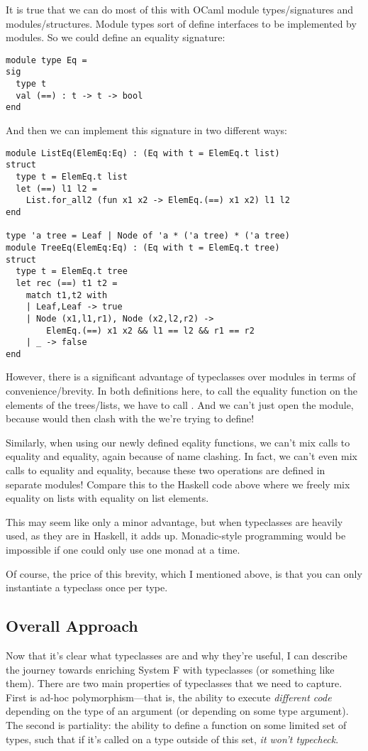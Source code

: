 \documentclass[pageno]{jpaper}
\begin{document}
{{{It is true that we can do most of this with OCaml module types/signatures and modules/structures. Module types sort of define interfaces to be implemented by modules. So we could define an equality signature:

\begin{lstlisting}
module type Eq = 
sig
  type t
  val (==) : t -> t -> bool
end
\end{lstlisting}

And then we can implement this signature in two different ways:

\begin{lstlisting}
module ListEq(ElemEq:Eq) : (Eq with t = ElemEq.t list)
struct
  type t = ElemEq.t list
  let (==) l1 l2 =
    List.for_all2 (fun x1 x2 -> ElemEq.(==) x1 x2) l1 l2
end

type 'a tree = Leaf | Node of 'a * ('a tree) * ('a tree)
module TreeEq(ElemEq:Eq) : (Eq with t = ElemEq.t tree)
struct
  type t = ElemEq.t tree
  let rec (==) t1 t2 =
    match t1,t2 with
    | Leaf,Leaf -> true
    | Node (x1,l1,r1), Node (x2,l2,r2) ->
        ElemEq.(==) x1 x2 && l1 == l2 && r1 == r2
    | _ -> false
end

\end{lstlisting}

However, there is a significant advantage of typeclasses over modules in terms of convenience/brevity.
In both definitions here, to call the equality function on the elements of the trees/lists,
we have to call . And we can't just open the  module, because
 would then clash with the \lsti{==} we're trying to define!

Similarly, when using our newly defined eqality functions, we can't mix calls to  equality
and  equality, again because of name clashing. In fact, we can't even mix calls to
 equality and  equality, because these two operations are defined in
separate modules! Compare this to the Haskell code above where we freely mix equality on lists with
equality on list elements.

This may seem like only a minor advantage, but when typeclasses are heavily used, as they are in Haskell, it adds up. Monadic-style programming would be impossible if one could only use one monad at a time.

Of course, the price of this brevity, which I mentioned above, is that you can only instantiate a typeclass
once per type.

\subsection{Overall Approach}
Now that it's clear what typeclasses are and why they're useful, I can describe the journey towards enriching System F with typeclasses (or something like them). There are two main properties
of typeclasses that we need to capture. First is ad-hoc polymorphism---that is, the ability to execute \textit{different code} depending on the type of an argument (or depending on some type argument).
The second is partiality: the ability to define a function on some limited set of types, such that if it's called on a type outside of this set, \textit{it won't typecheck}.

}}}
\end{document}
